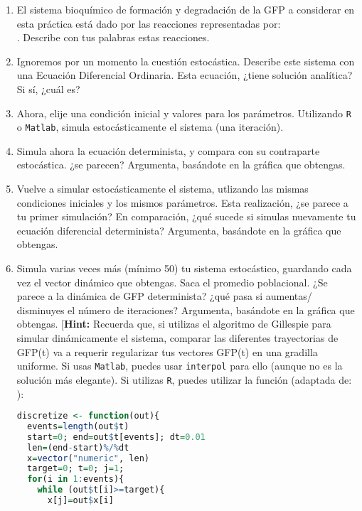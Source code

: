 \documentclass[10pt,letterpaper]{article}
\let\emptyset\varnothing
\begin{document}
\begin{enumerate}
\item El sistema bioquímico de formación y degradación de la GFP a considerar en esta práctica está dado por las reacciones representadas por: \\
\ch{$\emptyset$ ->[ $k_1$ ] GFP ->[ $k_2$ ] $\emptyset$}. Describe con tus palabras estas reacciones.
\item Ignoremos por un momento la cuestión estocástica. Describe este sistema con una Ecuación Diferencial Ordinaria. Esta ecuación, ¿tiene solución analítica? Si sí, ¿cuál es?
\item Ahora, elije una condición inicial y valores para los parámetros. Utilizando \verb|R| o \verb|Matlab|, simula estocásticamente el sistema (una iteración).  %
\item Simula ahora la ecuación determinista, y compara con su contraparte estocástica. ¿se parecen?   Argumenta, basándote en la gráfica que obtengas. 
\item Vuelve a simular estocásticamente el sistema, utlizando las mismas condiciones iniciales y los mismos parámetros. Esta realización, ¿se parece a tu primer simulación? En comparación, ¿qué sucede si simulas nuevamente tu ecuación diferencial determinista? Argumenta,  basándote en la gráfica que obtengas.
\item  Simula varias veces más (mínimo 50) tu sistema estocástico, guardando cada vez el vector dinámico que obtengas.  Saca el promedio poblacional. ¿Se parece a  la dinámica de GFP determinista? ¿qué pasa si aumentas/ disminuyes el número de iteraciones? Argumenta,  basándote en la gráfica que obtengas. [\textbf{Hint:} Recuerda que, si utilizas el algoritmo de Gillespie para simular dinámicamente el sistema, comparar las diferentes trayectorias de GFP(t) va a requerir regularizar tus vectores GFP(t) en una gradilla uniforme. Si usas \verb|Matlab|, puedes usar \verb|interpol| para ello (aunque no es la solución más elegante). Si utilizas \verb|R|, puedes utilizar la función (adaptada de: \cite{Wilkinson2006}):
\begin{framed}
\begin{lstlisting}[language=R]
discretize <- function(out){
  events=length(out$t)
  start=0; end=out$t[events]; dt=0.01 
  len=(end-start)%/%dt 
  x=vector("numeric", len) 
  target=0; t=0; j=1; 
  for(i in 1:events){
    while (out$t[i]>=target){
      x[j]=out$x[i] 

\end{lstlisting}
\end{framed}
\end{enumerate}
\end{document}
